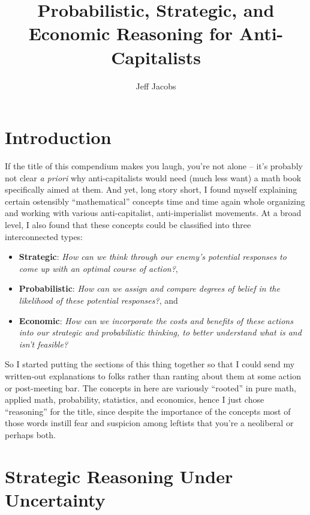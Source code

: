 \documentclass[12pt]{article}
\title{Probabilistic, Strategic, and Economic Reasoning for Anti-Capitalists}
\author{Jeff Jacobs}
\begin{document}
\maketitle

\section*{Introduction}

\doublespacing

If the title of this compendium makes you laugh, you're not alone -- it's probably not clear \textit{a priori} why anti-capitalists would need (much less want) a math book specifically aimed at them. And yet, long story short, I found myself explaining certain ostensibly ``mathematical'' concepts time and time again whole organizing and working with various anti-capitalist, anti-imperialist movements. At a broad level, I also found that these concepts could be classified into three interconnected types:
\begin{itemize}
\item \textbf{Strategic}: \textit{How can we think through our enemy's potential responses to come up with an optimal course of action?},
\item \textbf{Probabilistic}: \textit{How can we assign and compare degrees of belief in the likelihood of these potential responses?}, and
\item \textbf{Economic}: \textit{How can we incorporate the costs and benefits of these actions into our strategic and probabilistic thinking, to better understand what is and isn't feasible?}
\end{itemize}
So I started putting the sections of this thing together so that I could send my written-out explanations to folks rather than ranting about them at some action or post-meeting bar. The concepts in here are variously ``rooted'' in pure math, applied math, probability, statistics, and economics, hence I just chose ``reasoning'' for the title, since despite the importance of the concepts most of those words instill fear and suspicion among leftists that you're a neoliberal or perhaps both.







\section{Strategic Reasoning Under Uncertainty}
\end{document}
